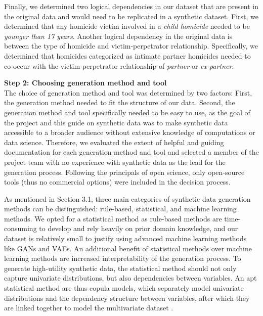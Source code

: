 Finally, we determined two logical dependencies in our dataset that are present in the original data and would need to be replicated in a synthetic dataset. First, we determined that any homicide victim involved in a \textit{child homicide} needed to be \textit{younger than 17 years}. Another logical dependency in the original data is between the type of homicide and victim-perpetrator relationship. Specifically, we determined that homicides categorized as intimate partner homicides needed to co-occur with the victim-perpetrator relationship of \textit{partner} or \textit{ex-partner}.

\textbf{Step 2: Choosing generation method and tool} \\
The choice of generation method and tool was determined by two factors: First, the generation method needed to fit the structure of our data. Second, the generation method and tool specifically needed to be easy to use, as the goal of the project and this guide on synthetic data was to make synthetic data accessible to a broader audience without extensive knowledge of computations or data science. Therefore, we evaluated the extent of helpful and guiding documentation for each generation method and tool and selected a member of the project team with no experience with synthetic data as the lead for the generation process. Following the principals of open science, only open-source tools (thus no commercial options) were included in the decision process.

As mentioned in Section 3.1, three main categories of synthetic data generation methods can be distinguished: rule-based, statistical, and machine learning methods. We opted for a statistical method as rule-based methods are time-consuming to develop and rely heavily on prior domain knowledge, and our dataset is relatively small to justify using advanced machine learning methods like GANs and VAEs. An additional benefit of statistical methods over machine learning methods are increased interpretability of the generation process. To generate high-utility synthetic data, the statistical method should not only capture univariate distributions, but also dependencies between variables. An apt statistical method are thus copula models, which separately model univariate distributions and the dependency structure between variables, after which they are linked together to model the multivariate dataset \cite{nelsen2006introduction}.

